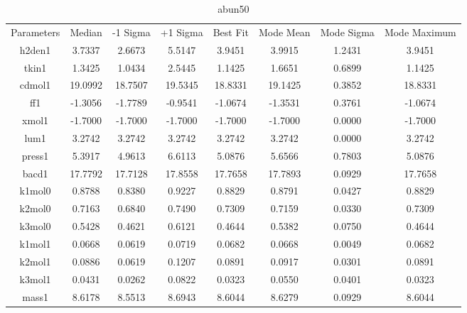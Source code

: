 \begin{table}
\caption{abun50}
\begin{tabular}{cccccccc}
Parameters & Median & -1 Sigma & +1 Sigma & Best Fit & Mode Mean & Mode Sigma & Mode Maximum \\
h2den1 & 3.7337 & 2.6673 & 5.5147 & 3.9451 & 3.9915 & 1.2431 & 3.9451 \\
tkin1 & 1.3425 & 1.0434 & 2.5445 & 1.1425 & 1.6651 & 0.6899 & 1.1425 \\
cdmol1 & 19.0992 & 18.7507 & 19.5345 & 18.8331 & 19.1425 & 0.3852 & 18.8331 \\
ff1 & -1.3056 & -1.7789 & -0.9541 & -1.0674 & -1.3531 & 0.3761 & -1.0674 \\
xmol1 & -1.7000 & -1.7000 & -1.7000 & -1.7000 & -1.7000 & 0.0000 & -1.7000 \\
lum1 & 3.2742 & 3.2742 & 3.2742 & 3.2742 & 3.2742 & 0.0000 & 3.2742 \\
press1 & 5.3917 & 4.9613 & 6.6113 & 5.0876 & 5.6566 & 0.7803 & 5.0876 \\
bacd1 & 17.7792 & 17.7128 & 17.8558 & 17.7658 & 17.7893 & 0.0929 & 17.7658 \\
k1mol0 & 0.8788 & 0.8380 & 0.9227 & 0.8829 & 0.8791 & 0.0427 & 0.8829 \\
k2mol0 & 0.7163 & 0.6840 & 0.7490 & 0.7309 & 0.7159 & 0.0330 & 0.7309 \\
k3mol0 & 0.5428 & 0.4621 & 0.6121 & 0.4644 & 0.5382 & 0.0750 & 0.4644 \\
k1mol1 & 0.0668 & 0.0619 & 0.0719 & 0.0682 & 0.0668 & 0.0049 & 0.0682 \\
k2mol1 & 0.0886 & 0.0619 & 0.1207 & 0.0891 & 0.0917 & 0.0301 & 0.0891 \\
k3mol1 & 0.0431 & 0.0262 & 0.0822 & 0.0323 & 0.0550 & 0.0401 & 0.0323 \\
mass1 & 8.6178 & 8.5513 & 8.6943 & 8.6044 & 8.6279 & 0.0929 & 8.6044 \\
\end{tabular}
\end{table}
